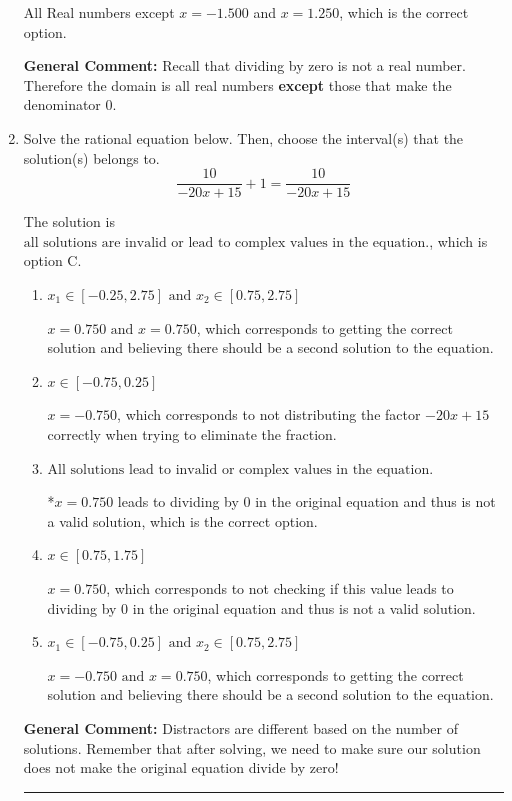 \documentclass{extbook}[14pt]
\newcommand{\litem}[1]{\item #1

\rule{\textwidth}{0.4pt}}
\begin{document}
\begin{enumerate}
{\begin{enumerate}[label=\Alph*.]
All Real numbers except $x = -1.500$ and $x = 1.250$, which is the correct option.
\end{enumerate}

\textbf{General Comment:} Recall that dividing by zero is not a real number. Therefore the domain is all real numbers \textbf{except} those that make the denominator 0.
}
\litem{
Solve the rational equation below. Then, choose the interval(s) that the solution(s) belongs to.
\[ \frac{10}{-20x + 15} + 1 = \frac{10}{-20x + 15} \]

The solution is \( \text{all solutions are invalid or lead to complex values in the equation.} \), which is option C.\begin{enumerate}[label=\Alph*.]
\item \( x_1 \in [-0.25, 2.75] \text{ and } x_2 \in [0.75,2.75] \)

$x = 0.750 \text{ and } x = 0.750$, which corresponds to getting the correct solution and believing there should be a second solution to the equation.
\item \( x \in [-0.75,0.25] \)

$x = -0.750$, which corresponds to not distributing the factor $-20x + 15$ correctly when trying to eliminate the fraction.
\item \( \text{All solutions lead to invalid or complex values in the equation.} \)

*$x = 0.750$ leads to dividing by 0 in the original equation and thus is not a valid solution, which is the correct option.
\item \( x \in [0.75,1.75] \)

$x = 0.750$, which corresponds to not checking if this value leads to dividing by 0 in the original equation and thus is not a valid solution.
\item \( x_1 \in [-0.75, 0.25] \text{ and } x_2 \in [0.75,2.75] \)

$x = -0.750 \text{ and } x = 0.750$, which corresponds to getting the correct solution and believing there should be a second solution to the equation.
\end{enumerate}

\textbf{General Comment:} Distractors are different based on the number of solutions. Remember that after solving, we need to make sure our solution does not make the original equation divide by zero!
}
\end{enumerate}
\end{document}
